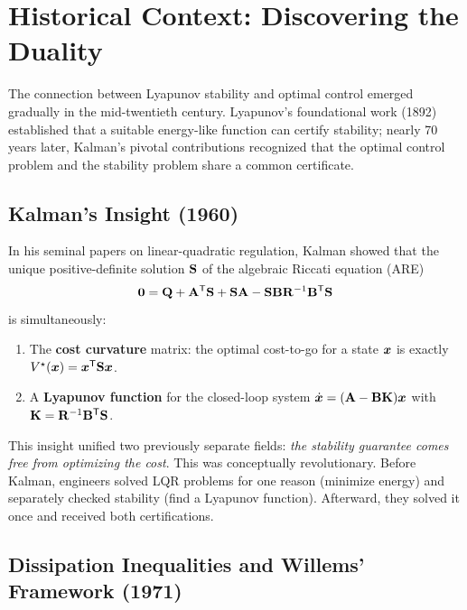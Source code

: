 \section{Historical Context: Discovering the Duality}

The connection between Lyapunov stability and optimal control emerged gradually in the mid-twentieth century.
Lyapunov's foundational work (1892) established that a suitable energy-like function can certify stability;
nearly 70 years later, Kalman's pivotal contributions recognized that the optimal control problem and the
stability problem share a common certificate.

\subsection{Kalman's Insight (1960)}

In his seminal papers on linear-quadratic regulation, Kalman showed that the unique positive-definite solution
$\mathbf{S}$ of the algebraic Riccati equation (ARE)
\begin{equation}
\mathbf{0} = \mathbf{Q} + \mathbf{A}^{\mathsf{T}}\mathbf{S} + \mathbf{S}\mathbf{A} - \mathbf{S}\mathbf{B}\mathbf{R}^{-1}\mathbf{B}^{\mathsf{T}}\mathbf{S}
\label{eq:ch6:are-steady}
\end{equation}
is simultaneously:
\begin{enumerate}
\item The \textbf{cost curvature} matrix: the optimal cost-to-go for a state $\bm{x}$ is exactly $V^\star(\bm{x}) = \bm{x}^{\mathsf{T}}\mathbf{S}\bm{x}$.
\item A \textbf{Lyapunov function} for the closed-loop system $\dot{\bm{x}} = (\mathbf{A}-\mathbf{B}\mathbf{K})\bm{x}$ with $\mathbf{K} = \mathbf{R}^{-1}\mathbf{B}^{\mathsf{T}}\mathbf{S}$.
\end{enumerate}

This insight unified two previously separate fields: \textit{the stability guarantee comes free from optimizing
the cost}. This was conceptually revolutionary. Before Kalman, engineers solved LQR problems for one reason (minimize
energy) and separately checked stability (find a Lyapunov function). Afterward, they solved it once and received both
certifications.

\subsection{Dissipation Inequalities and Willems' Framework (1971)}

